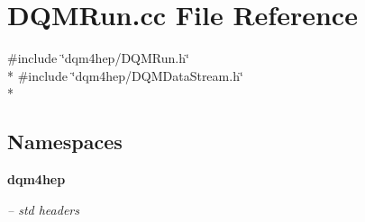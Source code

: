 \section{D\+Q\+M\+Run.\+cc File Reference}
\label{DQMRun_8cc}
{\ttfamily \#include \char`\"{}dqm4hep/\+D\+Q\+M\+Run.\+h\char`\"{}}\\*
{\ttfamily \#include \char`\"{}dqm4hep/\+D\+Q\+M\+Data\+Stream.\+h\char`\"{}}\\*
\subsection*{Namespaces}
\begin{DoxyCompactItemize}
\item 
 {\bf dqm4hep}
\begin{DoxyCompactList}\small\item\em -- std headers \end{DoxyCompactList}\end{DoxyCompactItemize}
